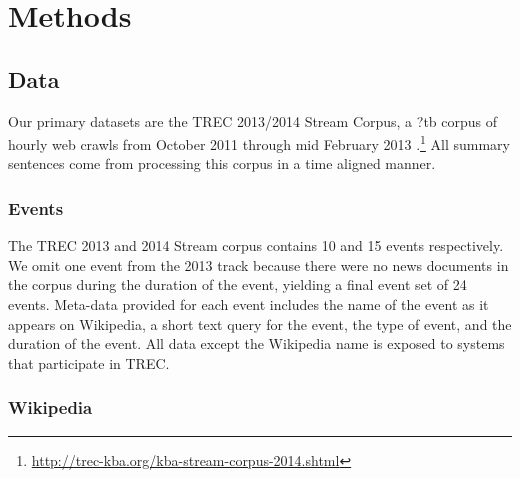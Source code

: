 
\section{Methods}
\label{sec:methods}
\subsection{Data}\label{sec:data}

Our primary datasets are the TREC 2013/2014 Stream Corpus, 
a ?tb corpus of hourly 
web crawls from October 2011
through mid February 2013
\cite{frank2012building}.\footnote{\url{http://trec-kba.org/kba-stream-corpus-2014.shtml}}
All summary sentences come from processing this
corpus in a time aligned manner.



\subsubsection{Events}

The TREC 2013 and 2014 Stream corpus contains  10 and 15 events respectively. We omit
one event from the 2013 track because there were no news documents in the 
corpus during the duration of the event, yielding a final event set of 24 
events. Meta-data provided for each event includes the name of the event
as it appears on Wikipedia, a short text query for the event, 
the type of event, and the 
duration of the event.
All data except the Wikipedia name is exposed to
systems that participate in TREC.

\subsubsection{Wikipedia}

